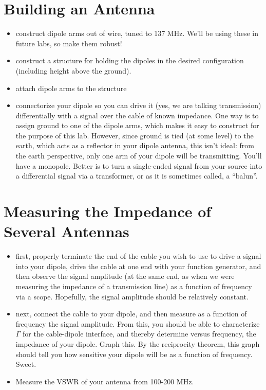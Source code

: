 \documentclass[11pt]{article}
\begin{document}
\section{Building an Antenna}
\begin{itemize}
\item construct dipole arms out of wire, tuned to 137 MHz.  We'll be using these in future 
labs, so make them robust!
\item construct a structure for holding the dipoles in the desired configuration (including height above the
ground).
\item attach dipole arms to the structure
\item connectorize your dipole so you can drive it (yes, we are talking transmission) differentially with 
a signal over the cable of known impedance.
One way is to assign ground to one of the dipole arms, which makes it easy to construct for the purpose of this
lab.  However, since ground is tied (at some level) to the earth, which acts as a reflector in your dipole
antenna, this isn't ideal: from the earth perspective, only one arm of your dipole will be transmitting.  You'll
have a monopole.  Better is to turn a single-ended signal from your source into a differential signal via
a transformer, or as it is sometimes called, a ``balun''.
\end{itemize}

\section{Measuring the Impedance of Several Antennas}

\begin{itemize}
\item first, properly terminate the end of the cable you wish to use to drive a signal into your dipole, drive
the cable at one end with your function generator, and
then observe the signal amplitude (at the same end, as when we were measuring the impedance of a transmission line)
as a function of frequency via a scope.  Hopefully, the signal amplitude should 
be relatively constant.
\item next, connect the cable to your dipole, and then measure as a function of frequency the signal amplitude.
From this, you should be able to characterize $\Gamma$ for the cable-dipole interface, and thereby determine
versus frequency, the impedance of your dipole.  Graph this.  By the reciprocity theorem, this graph should tell
you how sensitive your dipole will be as a function of frequency.  Sweet.
\item Measure the VSWR of your antenna from 100-200 MHz.
\end{itemize}
\end{document}
